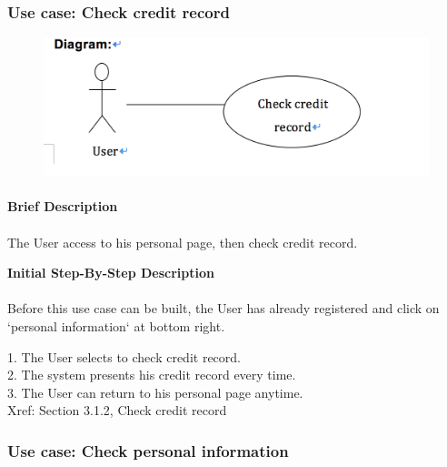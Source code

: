 \documentclass[12pt]{report}
\begin{document}
\subsubsection{Use case:  Check credit record}
\newpage

\begin{figure}[!htb]
  \includegraphics{2.PNG}
\end{figure}
\paragraph{}
\begin{flushleft}
\textbf{Brief Description }
\paragraph{}
The User access to his personal page, then check credit record. \\

\begin{flushleft}
\textbf{Initial Step-By-Step Description }
\paragraph{}
Before this use case can be built, the User has already registered and click on `personal information` at bottom right.

\begin{flushleft}
1.	The User selects to check credit record. \\
2.	The system presents his credit record every time. \\
3.	The User can return to his personal page anytime. \\
Xref: Section 3.1.2, Check credit record
\end{flushleft}
\end{flushleft}
\end{flushleft}

\subsubsection{Use case:  Check personal information }
\end{document}

